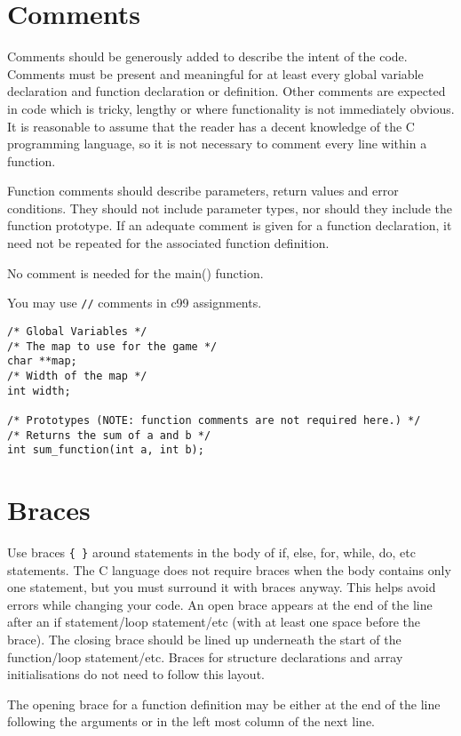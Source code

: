 \documentclass{article}
\begin{document}
\section{Comments}
Comments should be generously added to describe the intent of the code.
Comments must be present and meaningful for at least every global variable declaration and function declaration or definition.
Other comments are expected in code which is tricky, lengthy or where functionality is not immediately obvious.
It is reasonable to assume that the reader has a decent knowledge of the C programming language, so it is not necessary to comment every line within a function.

Function comments should describe parameters, return values and error conditions.
They should not include parameter types, nor should they include the function prototype.
If an adequate comment is given for a function declaration, it need not be repeated for the associated function definition.

No comment is needed for the main() function.

You may use \texttt{//} comments in c99 assignments.

\begin{lstlisting}
/* Global Variables */
/* The map to use for the game */
char **map;
/* Width of the map */
int width;

/* Prototypes (NOTE: function comments are not required here.) */
/* Returns the sum of a and b */
int sum_function(int a, int b);
\end{lstlisting}


\clearpage
\section{Braces}
Use braces \texttt{\{ \}} around statements in the body of if, else, for, while, do, etc statements.
The C language does not require braces when the body contains only one statement, but you must surround it with braces anyway.
This helps avoid errors while changing your code.
An open brace appears at the end of the line after an if statement/loop statement/etc (with at least one space before the brace).
The closing brace should be lined up underneath the start of the function/loop statement/etc.
Braces for structure declarations and array initialisations do not need to follow this layout.

The opening brace for a function definition may be either at the end of the line following the arguments or in the left most column of the next line.
\end{document}
